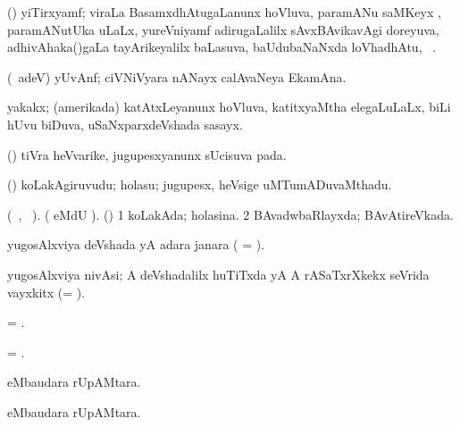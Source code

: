 \bentry
{} 
\gl{\nA} 
\bmng
(\ravi) yiTirxyamf; viraLa BasamxdhAtugaLanunx hoVluva, paramANu saMKeyx , paramANutUka  uLaLx,  yureVniyamf adirugaLalilx sAvxBAvikavAgi doreyuva, adhivAhaka()gaLa tayArikeyalilx baLasuva, baUdubaNaNxda loVhadhAtu, \saMkeV\ .
\emng
\eentry

\bentry
{} 
\gl{\nA} 
\bmng
(\bava\ adeV) yUvAnf; 
ciVNiVyara nANayx calAvaNeya EkamAna.
\emng
\eentry

\bentry
{} 
\gl{\nA} 
\bmng
yakakx; (amerikada) katAtxLeyanunx hoVluva, katitxyaMtha elegaLuLaLx, biLi hUvu biDuva, uSaNxparxdeVshada sasayx. \quad{}
\emng
\eentry

\bentry
{} 
\gl{\BAavayx}   
\bmng
(\ashi) tiVra heVvarike, jugupesxyanunx sUcisuva pada.
\emng
\eentry

\bentry
{} 
\gl{\nA}  
\bmng
(\ashi) koLakAgiruvudu; holasu; jugupesx, heVsige uMTumADuvaMthadu.
\emng
\eentry

\bentry
{} 
\gl{\gu} 
\bmng
(\tara\ , \tama\ ).
(  eMdU \parx).  (\ashi) 
\bnum
\num{1} koLakAda; holasina. 
\num{2} BAvadwbaRlayxda; BAvAtireVkada.
\enum
\emng
\eentry

\bentry
{} 
\gl{\gu} 
\bmng
yugosAlxviya deVshada yA adara janara ( = ).
\emng
\eentry

\bentry
{} 
\gl{\nA} 
\bmng
yugosAlxviya nivAsi; A deVshadalilx huTiTxda yA A rASaTxrXkekx seVrida vayxkitx (= ).
\emng
\eentry

\bentry
{} 
\gl{\gu} 
\bmng
= .
\emng
\eentry

\bentry
{} 
\gl{\nA} 
\bmng
= .
\emng
\eentry

\bentry
{} 
\gl{\BAavayx} 
\bmng
{} eMbaudara rUpAMtara.
\emng 
\eentry

\bentry
{} 
\gl{\nA} 
\bmng
{} eMbaudara rUpAMtara.
\emng 
\eentry

